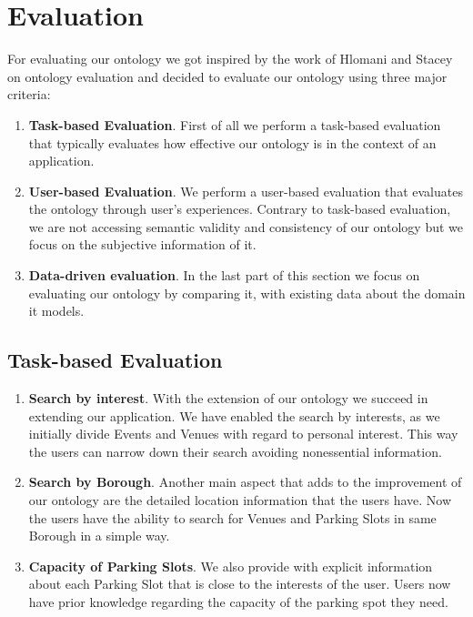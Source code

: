 \documentclass[runningheads,a4paper]{../../StyleFiles/llncs}
\begin{document}
\section{Evaluation}
For evaluating our ontology we got inspired by the work of Hlomani and Stacey
\cite{hlomani2014approaches} on ontology evaluation and decided to evaluate our
ontology using three major criteria:
\begin{enumerate}
	\item \textbf{Task-based Evaluation}. First of all we perform a task-based evaluation that typically evaluates how effective our ontology is in the context of an application.
	\item \textbf{User-based Evaluation}. We perform a user-based evaluation that evaluates the ontology through user's experiences. Contrary to task-based evaluation, we are not accessing semantic validity and consistency of our ontology but we focus on the subjective information of it.
	\item \textbf{Data-driven evaluation}. In the last part of this section we focus on evaluating our ontology by comparing it, with existing data about the domain it models.
\end{enumerate} 

\subsection{Task-based Evaluation}
\begin{enumerate}
	\item \textbf{Search by interest}.
	With the extension of our ontology we succeed in extending our application. We have enabled the search by interests, as we initially divide Events and Venues with regard to personal interest. This way the users can narrow down their search avoiding nonessential information.
	
	\item \textbf{Search by Borough}. Another main aspect that adds to the improvement of our ontology are the detailed location information that the users have. Now the users have the ability to search for Venues and Parking Slots in same Borough in a simple way.
	
	\item \textbf{Capacity of Parking Slots}. We also provide with explicit information about each Parking Slot that is close to the interests of the user. Users now have prior knowledge regarding the capacity of the parking spot they need.
\end{enumerate}
\end{document}
